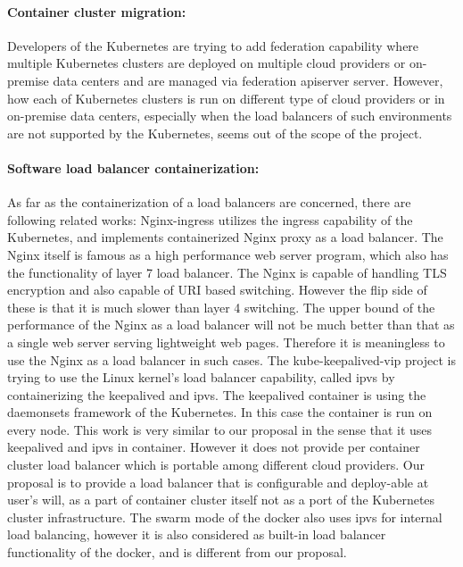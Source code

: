 \paragraph{\bf Container cluster migration:}
Developers of the Kubernetes are trying to add federation\cite{K8sFederation2017} capability 
where multiple Kubernetes clusters are deployed on multiple cloud providers or on-premise data centers 
and are managed via federation apiserver server. However, how each of Kubernetes clusters is run on different type of cloud providers
or in on-premise data centers, especially when the load balancers of such environments are not supported by the Kubernetes, 
seems out of the scope of the project. 

\paragraph{\bf Software load balancer containerization:}
As far as the containerization of a load balancers are concerned, there are following related works:
Nginx-ingress\cite{Pleshakov2016,NginxInc2016} utilizes the ingress\cite{K8sIngress2017} capability of the Kubernetes, 
and implements containerized Nginx proxy as a load balancer. The Nginx itself is famous as a high performance web server program,
which also has the functionality of layer 7 load balancer. The Nginx is capable of handling TLS encryption and also capable of  
URI based switching. However the flip side of these is that it is much slower than layer 4 switching.
The upper bound of the performance of the Nginx as a load balancer will not be much better than 
that as a single web server serving lightweight web pages. 
Therefore it is meaningless to use the Nginx as a load balancer in such cases.
The kube-keepalived-vip\cite{Prashanth2016} project is trying to use the Linux kernel's load balancer capability, 
called ipvs\cite{Zhang2000} by containerizing the keepalived\cite{ACassen2016} and ipvs. 
The keepalived container is using the daemonsets\cite{K8sDaemonsets2017} framework of the Kubernetes. 
In this case the container is run on every node.
This work is very similar to our proposal in the sense that it uses keepalived and ipvs in container. 
However it does not provide per container cluster load balancer which is portable among different cloud providers.   
Our proposal is to provide a load balancer that is configurable and deploy-able at user's will,
 as a part of container cluster itself not as a port of the Kubernetes cluster infrastructure.  
The swarm mode of the docker\cite{DockerCoreEngineering2016,DockerInc2017} also uses ipvs for internal load balancing,
however it is also considered as built-in load balancer functionality of the docker, 
and is different from our proposal.

